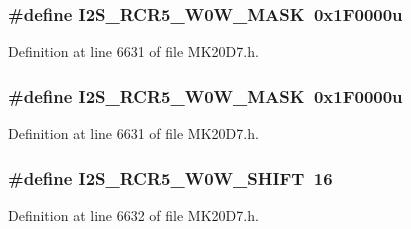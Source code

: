\subsubsection[{\texorpdfstring{I2\+S\+\_\+\+R\+C\+R5\+\_\+\+W0\+W\+\_\+\+M\+A\+SK}{I2S_RCR5_W0W_MASK}}]{\setlength{\rightskip}{0pt plus 5cm}\#define I2\+S\+\_\+\+R\+C\+R5\+\_\+\+W0\+W\+\_\+\+M\+A\+SK~0x1\+F0000u}\hypertarget{group___i2_s___register___masks_ga21ac7b9671ee42b3ff23e61fbc762bd6}{}\label{group___i2_s___register___masks_ga21ac7b9671ee42b3ff23e61fbc762bd6}


Definition at line 6631 of file M\+K20\+D7.\+h.

\subsubsection[{\texorpdfstring{I2\+S\+\_\+\+R\+C\+R5\+\_\+\+W0\+W\+\_\+\+M\+A\+SK}{I2S_RCR5_W0W_MASK}}]{\setlength{\rightskip}{0pt plus 5cm}\#define I2\+S\+\_\+\+R\+C\+R5\+\_\+\+W0\+W\+\_\+\+M\+A\+SK~0x1\+F0000u}\hypertarget{group___i2_s___register___masks_ga21ac7b9671ee42b3ff23e61fbc762bd6}{}\label{group___i2_s___register___masks_ga21ac7b9671ee42b3ff23e61fbc762bd6}


Definition at line 6631 of file M\+K20\+D7.\+h.

\subsubsection[{\texorpdfstring{I2\+S\+\_\+\+R\+C\+R5\+\_\+\+W0\+W\+\_\+\+S\+H\+I\+FT}{I2S_RCR5_W0W_SHIFT}}]{\setlength{\rightskip}{0pt plus 5cm}\#define I2\+S\+\_\+\+R\+C\+R5\+\_\+\+W0\+W\+\_\+\+S\+H\+I\+FT~16}\hypertarget{group___i2_s___register___masks_ga1b13ac40203b26b4adeb037896cbb88e}{}\label{group___i2_s___register___masks_ga1b13ac40203b26b4adeb037896cbb88e}


Definition at line 6632 of file M\+K20\+D7.\+h.

